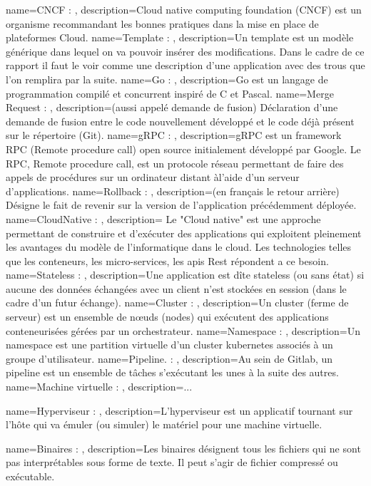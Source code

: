 {
    name=CNCF : ,
    description={Cloud native computing foundation (CNCF) est un organisme recommandant les bonnes pratiques dans la mise en place de plateformes Cloud.}
}
{
    name=Template : ,
    description={Un template est un modèle générique dans lequel on va pouvoir insérer des modifications. Dans le cadre de ce rapport il faut le voir comme une description d'une application avec des trous que l'on remplira par la suite.}
}
{
    name=Go : ,
    description={Go est un langage de programmation compilé et concurrent inspiré de C et Pascal.}
}
{
    name=Merge Request : ,
    description={(aussi appelé demande de fusion) Déclaration d'une demande de fusion entre le code nouvellement développé et le code déjà présent sur le répertoire (Git).}
}
{
    name=gRPC : ,
    description={gRPC est un framework RPC (Remote procedure call) open source initialement développé par Google. Le RPC, Remote procedure call, est un protocole réseau permettant de faire des appels de procédures sur un ordinateur distant àl’aide d’un serveur d’applications.}
}
{
    name=Rollback : ,
    description={(en français le retour arrière) Désigne le fait de revenir sur la version de l'application précédemment déployée.}
}
{
    name=CloudNative : ,
    description={ Le "Cloud native" est une approche permettant de construire et d'exécuter des applications qui exploitent pleinement les avantages du modèle de l'informatique dans le cloud. Les technologies telles que les conteneurs, les micro-services, les apis Rest répondent a ce besoin.}
}
{
    name=Stateless : ,
    description={Une application est dîte stateless (ou sans état) si aucune des données échangées avec un client n'est stockées en session (dans le cadre d'un futur échange).}
}
{
    name=Cluster : ,
    description={Un cluster  (ferme de serveur) est un ensemble de nœuds (nodes) qui exécutent des applications conteneurisées gérées par un orchestrateur.}
}
{
    name=Namespace : ,
    description={Un namespace est une partition virtuelle d'un cluster kubernetes associés à un groupe d'utilisateur.}
}
{
    name=Pipeline. : ,
    description={Au sein de Gitlab, un pipeline est un ensemble de tâches s'exécutant les unes à la suite des autres.}
}
{
    name=Machine virtuelle : ,
    description={...}
}

{
    name=Hyperviseur : ,
    description={L’hyperviseur est un applicatif tournant sur l’hôte qui va émuler (ou simuler) le matériel pour une machine virtuelle.}
}

{
    name=Binaires : ,
    description={Les binaires désignent tous les fichiers qui ne sont pas interprétables sous forme de texte. Il peut s'agir de fichier compressé ou exécutable.}
}



